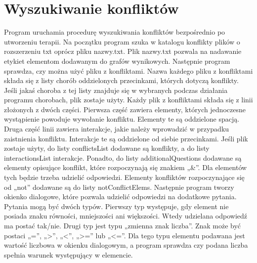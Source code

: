 \section{Wyszukiwanie konfliktów}

Program uruchamia procedurę wyszukiwania konfliktów bezpośrednio po utworzeniu terapii. 
Na początku program szuka w katalogu konflikty plików o rozszerzeniu txt oprócz pliku nazwy.txt. Plik nazwy.txt pozwala na nadawanie etykiet elementom dodawanym do grafów wynikowych. Następnie program sprawdza, czy można użyć pliku z konfliktami. Nazwa każdego pliku z konfliktami składa się z listy chorób oddzielonych przecinkami, których dotyczą konflikty. Jeśli jakaś choroba z tej listy znajduje się w wybranych podczas działania programu chorobach, plik zostaje użyty. Każdy plik z konfliktami składa się z linii złożonych z dwóch części. Pierwsza część zawiera elementy, których jednoczesne wystąpienie powoduje wywołanie konfliktu. Elementy te są oddzielone spacją. Druga część linii zawiera interakcje, jakie należy wprowadzić w przypadku zaistnienia konfliktu. Interakcje te są oddzielone od siebie przecinkami. Jeśli plik zostaje użyty, do listy conflictsList dodawane są konflikty, a do listy interactionsList interakcje. 
Ponadto, do listy additionalQuestions dodawane są elementy opisujące konflikt, które rozpoczynają się znakiem „\&”. Dla elementów tych będzie trzeba udzielić odpowiedzi. Elementy konfliktów rozpoczynające się od „not” dodawane są do listy notConflictElems. Następnie program tworzy okienko dialogowe, które pozwala udzielić odpowiedzi na dodatkowe pytania. Pytania mogą być dwóch typów. Pierwszy typ występuje, gdy element nie posiada znaku równości, mniejszości ani większości. Wtedy udzielana odpowiedź ma postać tak/nie. 
Drugi typ jest typu „zmienna znak liczba”. Znak może być postaci „=”, „>”, „<”, „>=” lub „<=”. Dla tego typu elementu podawana jest wartość liczbowa w okienku dialogowym, a program sprawdza czy podana liczba spełnia warunek występujący w elemencie. 

